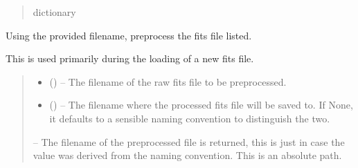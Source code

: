\documentclass[letterpaper,11pt,english]{sphinxmanual}
\begin{document}
\begin{savenotes}
\begin{fulllineitems}
\begin{savenotes}
\begin{fulllineitems}
\begin{quote}
\begin{description}
\sphinxAtStartPar
dictionary

\end{description}\end{quote}

\end{fulllineitems}\end{savenotes}


\begin{savenotes}\begin{fulllineitems}
\label{\detokenize{code/opihiexarata.gui.manual:opihiexarata.gui.manual.OpihiManualWindow._preprocess_fits_file}}
\pysigstartsignatures
{}
\pysigstopsignatures
\sphinxAtStartPar
Using the provided filename, preprocess the fits file listed.

\sphinxAtStartPar
This is used primarily during the loading of a new fits file.
\begin{quote}\begin{description}
\begin{itemize}
\item {} 
\sphinxAtStartPar
{} () – The filename of the raw fits file to be preprocessed.

\item {} 
\sphinxAtStartPar
{} (\sphinxstyleliteralemphasis{\sphinxupquote{, }}) – The filename where the processed fits file will be saved to. If
None, it defaults to a sensible naming convention to distinguish
the two.

\end{itemize}

\sphinxAtStartPar
{} – The filename of the preprocessed file is returned, this is just
in case the value was derived from the naming convention. This is
an absolute path.


\end{description}
\end{quote}
\end{fulllineitems}
\end{savenotes}
\end{fulllineitems}
\end{savenotes}
\end{document}
